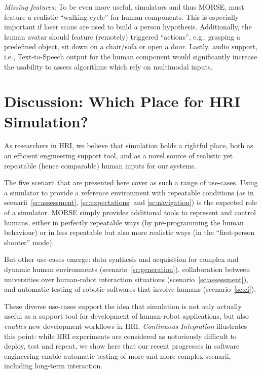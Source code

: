 \documentclass[conference]{IEEEtran}
\begin{document}
\emph{Missing features:} To be even more useful, simulators and thus MORSE, must
feature a realistic ``walking cycle'' for human components. This is especially
important if laser scans are used to build a person hypothesis. Additionally, the
human avatar should feature (remotely) triggered ``actions'', e.g., grasping a 
predefined object, sit down on a chair/sofa or open a door. Lastly, audio support, 
i.e., Text-to-Speech output for the human component would significantly increase
the usability to assess algorithms which rely on multimodal inputs.  

\section{Discussion: Which Place for HRI Simulation?}

As researchers in HRI, we believe that simulation holds a rightful place, both as
an efficient engineering support tool, and as a novel source of realistic yet
repeatable (hence comparable) human inputs for our systems.

The five scenarii that are presented here cover as such a range of use-cases.
Using a simulator to provide a reference environment with repeatable conditions
(as in scenarii~\ref{sc:assessment}, \ref{sc:expectations} and
\ref{sc:navigation}) is the expected role of a simulator. MORSE simply provides
additional tools to represent and control humans, either in perfectly repeatable
ways (by pre-programming the human behaviour) or in less repeatable but also
more realistic ways (in the ``first-person shooter'' mode).

But other use-cases emerge: data synthesis and acquisition for complex and
dynamic human environments (scenario~\ref{sc:generation}), collaboration between
universities over human-robot interaction situations
(scenario~\ref{sc:assessment}), and automatic testing of robotic softwares that
involve humans (scenario~\ref{sc:ci}).

These diverse use-cases support the idea that simulation is not only actually
useful as a support tool for development of human-robot applications, but also
\emph{enables} new development workflows in HRI. \emph{Continuous Integration}
illustrates this point: while HRI experiments are considered as notoriously
difficult to deploy, test and repeat, we show here that our recent progresses in
software engineering enable automatic testing of more and more complex scenarii,
including long-term interaction.
\end{document}
